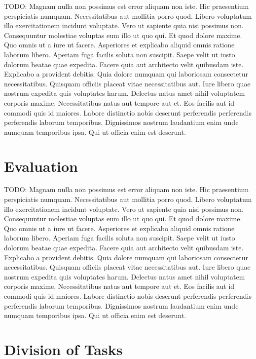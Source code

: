 \documentclass{acmsiggraph}
\begin{document}
TODO:
Magnam nulla non possimus est error aliquam non iste. Hic praesentium perspiciatis numquam. Necessitatibus aut mollitia porro quod. Libero voluptatum illo exercitationem incidunt voluptate. Vero ut sapiente quia nisi possimus non. Consequuntur molestiae voluptas eum illo ut quo qui.
Et quod dolore maxime. Quo omnis ut a iure ut facere. Asperiores et explicabo aliquid omnis ratione laborum libero. Aperiam fuga facilis soluta non suscipit.
Saepe velit ut iusto dolorum beatae quae expedita. Facere quia aut architecto velit quibusdam iste. Explicabo a provident debitis. Quia dolore numquam qui laboriosam consectetur necessitatibus.
Quisquam officiis placeat vitae necessitatibus aut. Iure libero quae nostrum expedita quis voluptates harum. Delectus natus amet nihil voluptatem corporis maxime. Necessitatibus natus aut tempore aut et.
Eos facilis aut id commodi quis id maiores. Labore distinctio nobis deserunt perferendis perferendis perferendis laborum temporibus. Dignissimos nostrum laudantium enim unde numquam temporibus ipsa. Qui ut officia enim est deserunt.


\section{Evaluation}
\label{sec:intro}

TODO:
Magnam nulla non possimus est error aliquam non iste. Hic praesentium perspiciatis numquam. Necessitatibus aut mollitia porro quod. Libero voluptatum illo exercitationem incidunt voluptate. Vero ut sapiente quia nisi possimus non. Consequuntur molestiae voluptas eum illo ut quo qui.
Et quod dolore maxime. Quo omnis ut a iure ut facere. Asperiores et explicabo aliquid omnis ratione laborum libero. Aperiam fuga facilis soluta non suscipit.
Saepe velit ut iusto dolorum beatae quae expedita. Facere quia aut architecto velit quibusdam iste. Explicabo a provident debitis. Quia dolore numquam qui laboriosam consectetur necessitatibus.
Quisquam officiis placeat vitae necessitatibus aut. Iure libero quae nostrum expedita quis voluptates harum. Delectus natus amet nihil voluptatem corporis maxime. Necessitatibus natus aut tempore aut et.
Eos facilis aut id commodi quis id maiores. Labore distinctio nobis deserunt perferendis perferendis perferendis laborum temporibus. Dignissimos nostrum laudantium enim unde numquam temporibus ipsa. Qui ut officia enim est deserunt.


\section{Division of Tasks}
\label{sec:intro}
\end{document}
